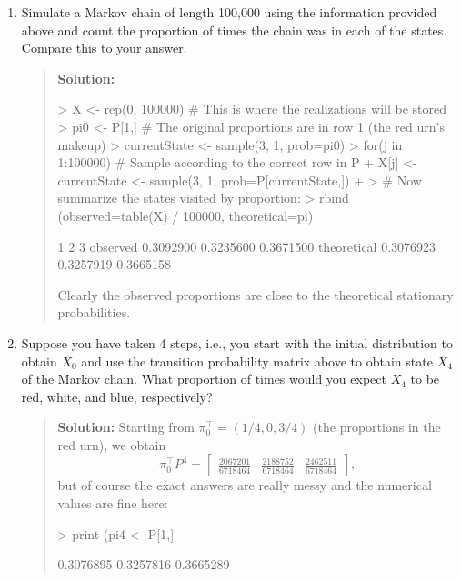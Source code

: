\documentclass{article}
\begin{document}
\begin{enumerate}
\begin{enumerate}
    \item Simulate a Markov chain of length 100,000 using the information
    provided above and count the proportion of times the chain was in each of
    the states. Compare this to your answer.
    \begin{quotation}{\bf Solution:}
\begin{Schunk}
\begin{Sinput}
> X <- rep(0, 100000) # This is where the realizations will be stored
> pi0 <- P[1,] # The original proportions are in row 1 (the red urn's makeup)
> currentState <- sample(3, 1, prob=pi0)
> for(j in 1:100000) { # Sample according to the correct row in P
+   X[j] <- currentState <- sample(3, 1, prob=P[currentState,])
+ }
> # Now summarize the states visited by proportion:
> rbind (observed=table(X) / 100000, theoretical=pi)
\end{Sinput}
\begin{Soutput}
                    1         2         3
observed    0.3092900 0.3235600 0.3671500
theoretical 0.3076923 0.3257919 0.3665158
\end{Soutput}
\end{Schunk}
    Clearly the observed proportions are close to the theoretical
    stationary probabilities.
    \end{quotation}

    \item Suppose you have taken 4 steps, i.e., you start with the initial
    distribution to obtain $X_0$ and use the transition probability matrix above
    to obtain state $X_4$ of the Markov chain. What proportion of times would
    you expect $X_4$ to be red, white, and blue, respectively?
    \begin{quotation}{\bf Solution:}
    Starting from $\pi_0^\top=(1/4, 0, 3/4)$ (the proportions in the red urn), we obtain
    \[
    \pi_0^\top P^4 = 
    \begin{bmatrix}
    \frac{2067201}{6718464} & \frac{2188752}{6718464} & \frac{2462511}{6718464}
    \end{bmatrix},
    \]
    but of course the exact answers are really messy and the numerical values are 
    fine here:
\begin{Schunk}
\begin{Sinput}
> print (pi4 <- P[1,] %*% P %*% P %*% P %*% P)
\end{Sinput}
\begin{Soutput}
          [,1]      [,2]      [,3]
[1,] 0.3076895 0.3257816 0.3665289
\end{Soutput}
\end{Schunk}
    \end{quotation}
 

\end{enumerate}
\end{enumerate}
\end{document}
